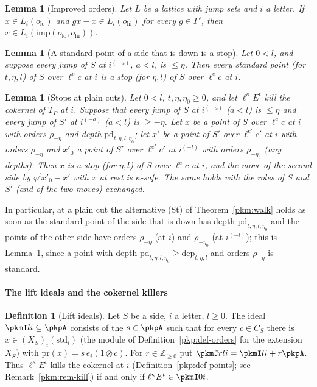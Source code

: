 \documentclass[10pt]{amsart}
\newtheorem{lemma}[theorem]{Lemma}
\theoremstyle{definition}
\newtheorem{definition}[theorem]{Definition}
\theoremstyle{remark}
\newcommand{\Z}{\mathbb Z}
\begin{document}
\begin{lemma}[Improved orders]\label{pkm:improved}
Let $L$ be a lattice with jump sets and $i$ a letter. If $x\in L_i(o_{\mathrm{lo}})$ and $gx-x\in
L_i(o_{\mathrm{hi}})$ for every $g\in\Gamma'$, then $x\in L_i(\mathrm{imp}(o_{\mathrm{lo}},o_{\mathrm{hi}}))$.
\end{lemma}

\begin{lemma}[A standard point of a side that is down is a stop]\label{pkm:down}
Let $0<l$, and suppose every jump of $S$ at $i^{(-a)}$, $a<l$, is $\le\eta$. Then every standard point
(for $t,\eta,l$) of $S$ over $\ell^ec$ at $i$ is a stop (for $\eta,l$) of $S$ over $\ell^ec$ at $i$.
\end{lemma}

\begin{lemma}[Stops at plain cuts]\label{pkm:plain}
Let $0<l$, $t,\eta,\eta_0\ge0$, and let $\ell^\kappa E^t$ kill the cokernel of $T_P$ at $i$. Suppose that
every jump of $S$ at $i^{(-a)}$ ($a<l$) is $\le\eta$ and every jump of $S'$ at $i^{(-a)}$ ($a<l$) is
$\ge-\eta$. Let $x$ be a point of $S$ over $\ell^ec$ at $i$ with orders $\rho_{-\eta}$ and depth
$\mathrm{pd}_{t,\eta,l,\eta_0}$; let $x'$ be a point of $S'$ over $\ell^{e'}c'$ at $i$ with orders
$\rho_{-\eta}$ and $x'_0$ a point of $S'$ over $\ell^{e'}c'$ at $i^{(-l)}$ with orders $\rho_{-\eta_0}$
(any depths). Then $x$ is a stop (for $\eta,l$) of $S$ over $\ell^ec$ at $i$, and the move of the
second side by $\varphi^lx'_0-x'$ with $x$ at rest is $\kappa$-safe. The same holds with the roles of
$S$ and $S'$ (and of the two moves) exchanged.
\end{lemma}

In particular, at a plain cut the alternative (St) of Theorem~\ref{pkm:walk} holds as soon as the
standard point of the side that is down has depth $\mathrm{pd}_{t,\eta,l,\eta_0}$ and the points of
the other side have orders $\rho_{-\eta}$ (at $i$) and $\rho_{-\eta_0}$ (at $i^{(-l)}$); this is
Lemma~\ref{pkm:plain}, since a point with depth $\mathrm{pd}_{t,\eta,l,\eta_0}\ge\mathrm{dep}_{t,\eta,l}$
and orders $\rho_{-\eta}$ is standard.

\paragraph*{The lift ideals and the cokernel killers}

\begin{definition}[Lift ideals]\label{pkm:def-J}
Let $S$ be a side, $i$ a letter, $l\ge0$. The ideal $\pkmI li\subseteq\pkpA$ consists of the
$s\in\pkpA$ such that for every $c\in C_S$ there is $x\in(X_S)_i(\mathrm{std}_l)$ (the module of
Definition~\ref{pkp:def-orders} for the extension $X_S$) with $\mathrm{pr}(x)=s\,e_i(1\otimes c)$.
For $r\in\Z_{\ge0}$ put $\pkmJ rli=\pkmI li+r\pkpA$. Thus $\ell^\kappa E^t$ kills the cokernel at $i$
(Definition~\ref{pkp:def-points}; see Remark~\ref{pkm:rem-kill}) if and only if
$\ell^\kappa E^t\in\pkmI0i$.
\end{definition}
\end{document}

